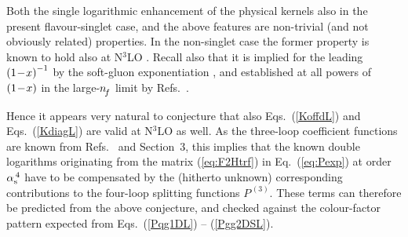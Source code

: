 \documentclass[12pt]{article}
\newcommand{\as}{\alpha_{\rm s}}
\begin{document}
Both the single logarithmic enhancement of the physical kernels also in the
present flavour-singlet case, and the above features are non-trivial (and not
obviously related) properties. In the non-singlet case the former property is
known to hold also at N$^3$LO \cite{MV5}. Recall also that it is implied 
\cite{NV3} for the leading $\x1^{-1}$ by the soft-gluon exponentiation 
\cite{SoftGlue}, and established at all powers of $\x1$ in the large-${n^{}_{\! f}}$ 
limit by Refs.~\cite{Gracey:1994nn,Mankiewicz:1997gz}. 

Hence it appears very natural to conjecture that also Eqs.~(\ref{KoffdL}) and
Eqs.~(\ref{KdiagL}) are valid at N$^3$LO as well. As the three-loop coefficient
functions are known from Refs.~\cite{MVV6} and Section~3, this implies that the
known double logarithms originating from the matrix (\ref{eq:F2Htrf}) in 
Eq.~(\ref{eq:Pexp}) at order $\as^{\,4}$ have to be compensated by the 
(hitherto unknown) corresponding contributions to the four-loop splitting 
functions $P^{\,(3)}$. These terms can therefore be predicted from the above
conjecture, and checked against the colour-factor pattern expected from 
Eqs.~(\ref{Pqg1DL}) -- (\ref{Pgg2DSL}).
\end{document}
